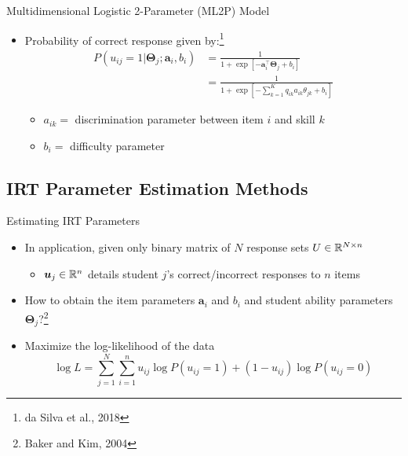 \documentclass{beamer}
\def \R{\ensuremath \mathbb{R}}
\newcommand{\vect}[1]{\boldsymbol{#1}}
\theoremstyle{definition}
\begin{document}
\begin{frame}{Multidimensional Logistic 2-Parameter (ML2P) Model}
\begin{itemize}
  \item Probability of correct response given by:\footnote{da Silva et al., 2018}
  \begin{align*}
  P(u_{ij}=1 | \vect\Theta_j; \vect a_i, b_i) &= \frac{1}{1+\exp\left[-\vect a_i^\top \vect \Theta_j + b_i\right]} \\
  &= \frac{1}{1 + \exp[-\sum_{k=1}^K q_{ik}a_{ik}\theta_{jk} + b_i]}
\end{align*}
  \begin{itemize}
    \item<2-> $a_{ik} =$ discrimination parameter between item $i$ and skill $k$ 
    \item<2-> $b_i =$ difficulty parameter
  \end{itemize}
\end{itemize}
\end{frame}

\subsection{IRT Parameter Estimation Methods}

\begin{frame}{Estimating IRT Parameters}
  \begin{itemize}
    \item In application, given only binary matrix of $N$ response sets $U \in \R^{N\times n}$
      \begin{itemize}
        \item $\vect u_j \in \R^n$ details student $j$'s correct/incorrect responses to $n$ items
      \end{itemize}
    \item How to obtain the item parameters $\vect a_i$ and $b_i$ and student ability parameters $\vect \Theta_j$?\footnote{Baker and Kim, 2004}
    \item<2-> Maximize the log-likelihood of the data
      \[\log L = \sum_{j=1}^N \sum_{i=1}^n u_{ij}\log P(u_{ij} = 1) + (1-u_{ij})\log P(u_{ij}=0)\]
  \end{itemize}
\end{frame}
\end{document}

